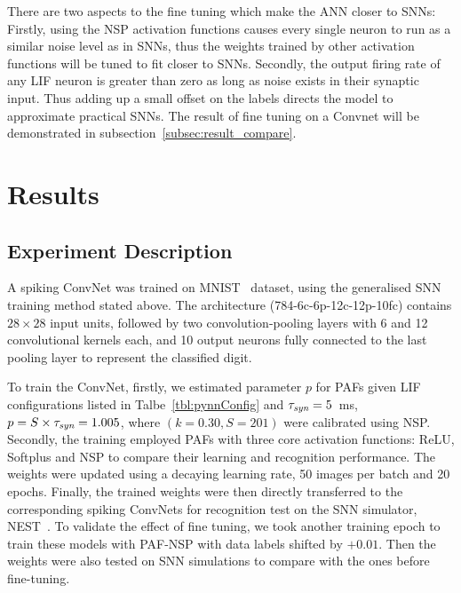 \documentclass{article}
\begin{document}
	
	There are two aspects to the fine tuning which make the ANN closer to SNNs:
	Firstly, using the NSP activation functions causes every single neuron to run as a similar noise level as in SNNs, thus the weights trained by other activation functions will be tuned to fit closer to SNNs.
	Secondly, the output firing rate of any LIF neuron is greater than zero as long as noise exists in their synaptic input.
	Thus adding up a small offset on the labels directs the model to approximate practical SNNs. 
	The result of fine tuning on a Convnet will be demonstrated in subsection~\ref{subsec:result_compare}.
	
	\section{Results}
	\label{sec:result}
	
	\subsection{Experiment Description}
	A spiking ConvNet was trained on MNIST~\cite{lecun1998gradient} dataset, 
	using the generalised SNN training method stated above.
	The architecture (784-6c-6p-12c-12p-10fc) contains $28\times28$ input units, followed by two convolution-pooling layers with 6 and 12 convolutional kernels each, and 10 output neurons fully connected to the last pooling layer to represent the classified digit.
	
	To train the ConvNet, firstly, we estimated parameter $p$ for PAFs given LIF configurations listed in Talbe~\ref{tbl:pynnConfig} and $\tau_{\textit{\textrm{syn}}}=5$~ms, $p = S \times \tau_{\textit{\textrm{syn}}} = 1.005$, where $(k=0.30, S=201)$ were calibrated using NSP. 
	Secondly, the training employed PAFs with three core activation functions: ReLU, Softplus and NSP to compare their learning and recognition performance.
	The weights were updated using a decaying learning rate, 50 images per batch and 20 epochs.
	Finally, the trained weights were then directly transferred to the corresponding spiking ConvNets for recognition test on the SNN simulator, NEST~\cite{gewaltig2007nest}.
	To validate the effect of fine tuning, we took another training epoch to train these models with PAF-NSP with data labels shifted by $+0.01$.
	Then the weights were also tested on SNN simulations to compare with the ones before fine-tuning.
	
\end{document}
